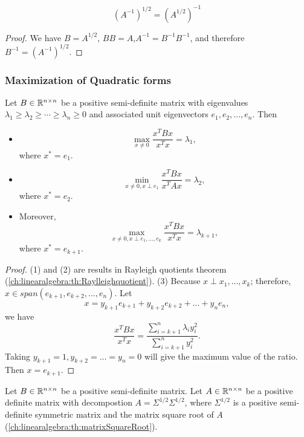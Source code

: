 \begin{refsection}
\begin{corollary}
	$$(A^{-1})^{1/2} = (A^{1/2})^{-1}$$
\end{corollary}
\begin{proof}
	We have
	$B = A^{1/2}$, $BB=A$,$A^{-1} = B^{-1}B^{-1}$, and therefore $B^{-1} = (A^{-1})^{1/2}$.
\end{proof}




\subsubsection{Maximization of Quadratic forms}

\begin{theorem}\label{ch:linearalgebra:th:MaximizingQuadraticFormsOnUnitSpheres}
Let $B\in \mathbb{R}^{n\times n}$ be a positive semi-definite matrix with eigenvalues $\lambda_1\geq\lambda_2\geq \cdots\geq \lambda_n \geq 0$ and associated unit eigenvectors $e_1,e_2,...,e_n$. Then
\begin{itemize}
	\item $$\max_{x\neq 0} \frac{x^TBx}{x^Tx} = \lambda_1,$$
	where $x^*=e_1$.
	\item $$\min_{x\neq 0, x\perp e_1} \frac{x^TBx}{x^TAx} = \lambda_2,$$
	where $x^*=e_2$.
	\item Moreover, $$\max_{x\neq 0, x\perp e_1,...,e_k} \frac{x^TBx}{x^Tx} = \lambda_{k+1},$$
	where $x^*=e_{k+1}$.
\end{itemize}
\end{theorem}
\begin{proof}
(1) and (2) are results in Rayleigh quotients theorem (\autoref{ch:linearalgebra:th:Raylleighquotient}). (3)	Because $x\perp x_1,...,x_k$; therefore, $x\in span(e_{k+1}, e_{k+2},..., e_n)$. Let
$$x = y_{k+1}e_{k+1} + y_{k+2} e_{k+2} + ... + y_n e_n,$$
we have
$$\frac{x^TBx}{x^Tx} = \frac{\sum_{i=k+1}^n \lambda_i y_i^2}{\sum_{i=k+1}^n y_i^2}.$$
Taking $y_{k+1} = 1, y_{k+2} = ... = y_n = 0$ will give the maximum value of the ratio. 
Then $x = e_{k+1}$.
\end{proof}

\begin{corollary}\label{ch:linearalgebra:th:MaximizingGeneralizedQuadraticFormsOnUnitSpheres}
	Let $B\in \mathbb{R}^{n\times n}$ be a positive semi-definite matrix. Let $A \in \mathbb{R}^{n\times n}$ be a positive definite matrix with decompostion $A = \Sigma^{1/2}\Sigma^{1/2}$, where $\Sigma^{1/2}$ is a positive semi-definite symmetric matrix and the matrix square root of $A$ (\autoref{ch:linearalgebra:th:matrixSquareRoot}).
	

\end{corollary}
\end{refsection}
